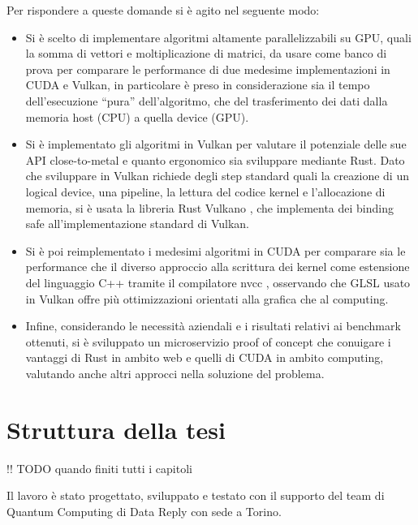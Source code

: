 Per rispondere a queste domande si è agito nel seguente modo:

\begin{itemize}
    \item Si è scelto di implementare algoritmi altamente parallelizzabili su GPU, quali la somma di vettori e moltiplicazione di matrici, da usare come banco di prova per comparare le performance di due medesime implementazioni in CUDA e Vulkan, in particolare è preso in considerazione sia il tempo dell'esecuzione ``pura'' dell'algoritmo, che del trasferimento dei dati dalla memoria host (CPU) a quella device (GPU).
    \item Si è implementato gli algoritmi in Vulkan per valutare il potenziale delle sue API close-to-metal e quanto ergonomico sia sviluppare mediante Rust. Dato che sviluppare in Vulkan richiede degli step standard quali la creazione di un logical device, una pipeline, la lettura del codice kernel e l'allocazione di memoria, si è usata la libreria Rust Vulkano \cite[]{github:Vulkano}, che implementa dei binding safe all'implementazione standard di Vulkan.
    \item Si è poi reimplementato i medesimi algoritmi in CUDA per comparare sia le performance che il diverso approccio alla scrittura dei kernel come estensione del linguaggio C++ tramite il compilatore nvcc \cite[]{Nvidia:nvcc}, osservando che GLSL \cite[]{KG:GLSL} usato in Vulkan offre più ottimizzazioni orientati alla grafica che al computing.
    \item Infine, considerando le necessità aziendali e i risultati relativi ai benchmark ottenuti, si è sviluppato un microservizio proof of concept che conuigare i vantaggi di Rust in ambito web e quelli di CUDA in ambito computing, valutando anche altri approcci nella soluzione del problema.
\end{itemize}



\section[Struttura della tesi]{Struttura della tesi}

!! TODO quando finiti tutti i capitoli

Il lavoro è stato progettato, sviluppato e testato con il supporto del team di Quantum Computing di Data Reply con sede a Torino. 

